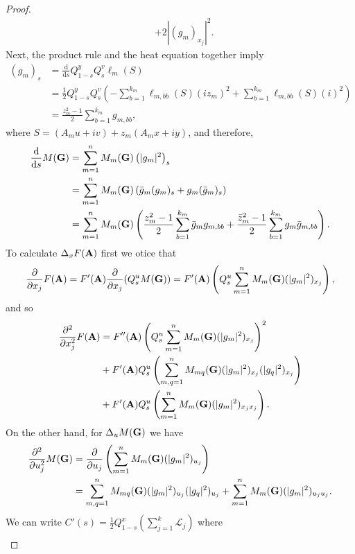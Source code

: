 \documentclass[9pt, a4paper]{amsart}
\newcommand{\1}{{\chi_{}}}%
\numberwithin{equation}{section}
\begin{document}
\begin{proof}
\begin{align*}
			&  +2|(g_m)_{x_j}|^2.  
		\end{align*}
		Next, the product rule and the heat equation together imply
		\begin{align*}
			(g_m)_s&=\frac{\mathrm{d}}{\mathrm{d}s}Q_{1-s}^yQ_s^v\ell_m(S) \\
			&=\frac{1}{2}Q_{1-s}^yQ_s^v\left(-\sum_{b=1}^{k_m}\ell_{m,bb}(S)(iz_m)^2+\sum_{b=1}^{k_m}\ell_{m,bb}(S)(i)^2\right)\\
			&=\frac{z_m^2-1}{2}\sum_{b=1}^{k_m}g_{m,bb},
		\end{align*}
		where $S=( A_m u+iv)+z_m( A_m x+iy)$, and therefore, 
		\begin{align*}
			\frac{\mathrm{d}}{\mathrm{d}s}M({\bf{G}})&=\sum_{m=1}^nM_{m}({\bf{G}})\left(|g_m|^2\right)_s\\
			&=\sum_{m=1}^nM_{m}({\bf{G}})\left(\bar{g}_m(g_m)_s+g_m(\bar{g}_m)_s\right)\\
			&=\sum_{m=1}^nM_{m}({\bf{G}})\left(\frac{z^{2}_m-1}{2}\sum_{b=1}^{k_m}\bar{g}_mg_{m,bb}+\frac{\bar{z}^{2}_m-1}{2}\sum_{b=1}^{k_m}g_m\bar{g}_{m,bb}\right).
		\end{align*}
		To calculate $\Delta_xF({\bf{A}})$ first we otice that 
		\begin{equation*}
			\frac{\partial}{\partial x_j}F({\bf{A}})=F'({\bf{A}})	\frac{\partial}{\partial x_j}(Q_s^uM({\bf{G}}))=F'({\bf{A}})\left(Q_s^u\sum_{m=1}^nM_{m}({\bf{G}})(|g_m|^2)_{x_j}\right),
		\end{equation*}
		and so
		\begin{align*}
			\frac{\partial^2}{\partial x_j^2}F({\bf{A}})&=F''({\bf{A}})\left(Q_s^u\sum_{m=1}^nM_{m}({\bf{G}})(|g_m|^2)_{x_j}\right)^2\\
			&+F'({\bf{A}})Q_s^u\left(\sum_{m, q=1}^{n}M_{mq}({\bf{G}})(|g_m|^2)_{x_j}(|g_q|^2)_{x_j} \right)\\
			&+F'({\bf{A}})Q_s^u\left( \sum_{m=1}^nM_{m}({\bf{G}})(|g_m|^2)_{x_jx_j}\right).
		\end{align*}
		On the other hand, for $\Delta_uM({\bf{G}})$ we have
		\begin{align*}
			\frac{\partial^2}{\partial u_j^2}M({\bf{G}})&=\frac{\partial}{\partial u_j}\left(\sum_{m=1}^nM_{m}({\bf{G}})(|g_m|^2)_{u_j}\right)\\
			&=\sum_{m, q=1}^{n}M_{mq}({\bf{G}})(|g_m|^2)_{u_j}(|g_q|^2)_{u_j}+\sum_{m=1}^nM_{m}({\bf{G}})(|g_m|^2)_{u_ju_j}.
		\end{align*}
		We can write $C'(s)=\frac{1}{2}Q_{1-s}^x\left(\sum_{j=1}^k\mathcal{L}_j\right)$ where 
		\begin{align*}

\end{align*}
\end{proof}
\end{document}
